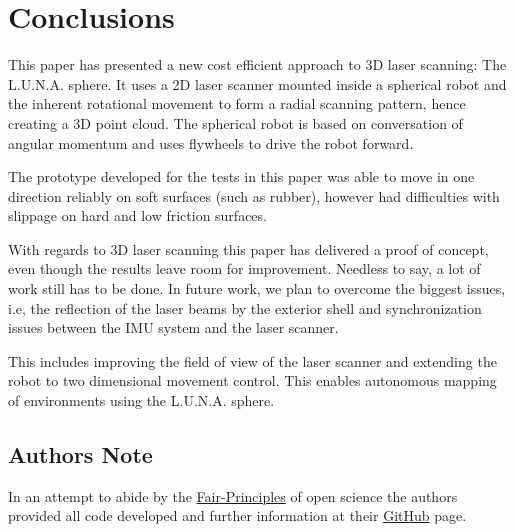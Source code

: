 \section{Conclusions}
\label{sec:conclusions}

This paper has presented a new cost efficient approach to 3D laser scanning: The L.U.N.A. sphere.
It uses a 2D laser scanner mounted inside a spherical robot and the inherent rotational movement to form a radial scanning pattern, hence creating a 3D point cloud.
The spherical robot is based on conversation of angular momentum and uses flywheels to drive the robot forward. 

The prototype developed for the tests in this paper was able to move in one direction reliably on soft surfaces (such as rubber), however had difficulties with slippage on hard and low friction surfaces.

With regards to 3D laser scanning this paper has delivered a proof of concept, even though the results leave room for improvement.
Needless to say, a lot of work still has to be done. 
In future work, we plan to overcome the biggest issues, i.e, the reflection of the laser beams by the exterior shell and synchronization issues between the IMU system and the laser scanner. 

This includes improving the field of view of the laser scanner and extending the robot to two dimensional movement control. This enables autonomous mapping of environments using the L.U.N.A. sphere. 

\subsection*{Authors Note}

In an attempt to abide by the \href{https://www.go-fair.org/fair-principles}{Fair-Principles} of open science the authors provided all code developed and further information at their \href{https://github.com/fallow24/L.U.N.A}{GitHub} page.